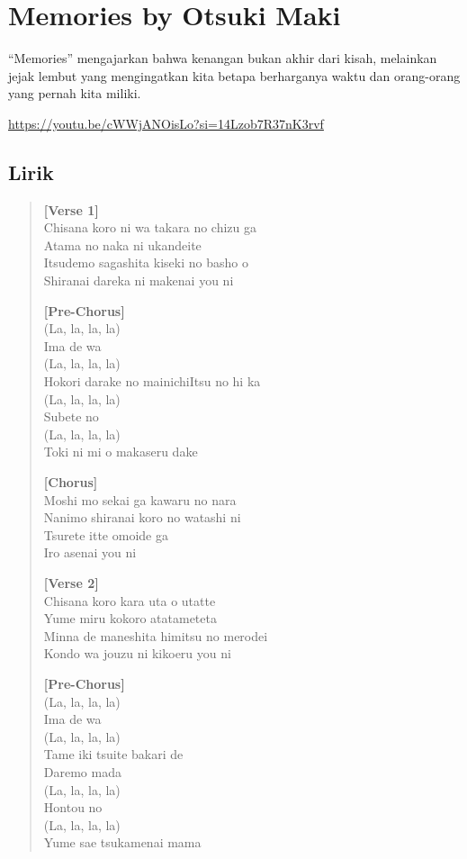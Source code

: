 \documentclass[
  letterpaper,
  DIV=11,
  numbers=noendperiod]{scrreprt}
\begin{document}
\section{Memories by Otsuki Maki}\label{memories-by-otsuki-maki}

``Memories'' mengajarkan bahwa kenangan bukan akhir dari kisah,
melainkan jejak lembut yang mengingatkan kita betapa berharganya waktu
dan orang-orang yang pernah kita miliki.

\url{https://youtu.be/cWWjANOisLo?si=14Lzob7R37nK3rvf}

\subsection{Lirik}\label{lirik-1}

\begin{quote}
\textbf{{[}Verse 1{]}}\\
Chisana koro ni wa takara no chizu ga\\
Atama no naka ni ukandeite\\
Itsudemo sagashita kiseki no basho o\\
Shiranai dareka ni makenai you ni

\textbf{{[}Pre-Chorus{]}}\\
(La, la, la, la)\\
Ima de wa\\
(La, la, la, la)\\
Hokori darake no mainichiItsu no hi ka\\
(La, la, la, la)\\
Subete no\\
(La, la, la, la)\\
Toki ni mi o makaseru dake

\textbf{{[}Chorus{]}}\\
Moshi mo sekai ga kawaru no nara\\
Nanimo shiranai koro no watashi ni\\
Tsurete itte omoide ga\\
Iro asenai you ni

\textbf{{[}Verse 2{]}}\\
Chisana koro kara uta o utatte\\
Yume miru kokoro atatameteta\\
Minna de maneshita himitsu no merodei\\
Kondo wa jouzu ni kikoeru you ni

\textbf{{[}Pre-Chorus{]}}\\
(La, la, la, la)\\
Ima de wa\\
(La, la, la, la)\\
Tame iki tsuite bakari de\\
Daremo mada\\
(La, la, la, la)\\
Hontou no\\
(La, la, la, la)\\
Yume sae tsukamenai mama


\end{quote}
\end{document}
